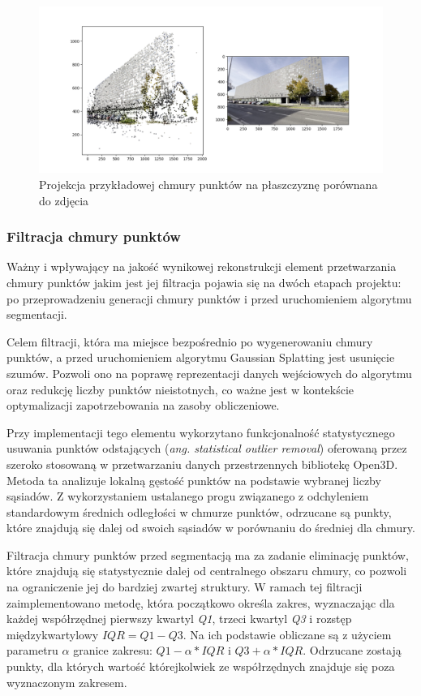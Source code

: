 \begin{figure}[!ht]
  \centering
  \includegraphics[width=0.9\linewidth]{img/sfm_projection.png}
  \caption{Projekcja przykładowej chmury punktów na płaszczyznę porównana do zdjęcia}
\end{figure}

\subsubsection{Filtracja chmury punktów}
Ważny i wpływający na jakość wynikowej rekonstrukcji element przetwarzania chmury punktów jakim jest jej filtracja pojawia się na dwóch etapach projektu: po przeprowadzeniu generacji chmury punktów i przed uruchomieniem algorytmu segmentacji. 

Celem filtracji, która ma miejsce bezpośrednio po wygenerowaniu chmury punktów, a przed uruchomieniem algorytmu Gaussian Splatting jest usunięcie szumów. Pozwoli ono na poprawę reprezentacji danych wejściowych do algorytmu oraz redukcję liczby punktów nieistotnych, co ważne jest w kontekście optymalizacji zapotrzebowania na zasoby obliczeniowe.

Przy implementacji tego elementu wykorzytano funkcjonalność statystycznego usuwania punktów odstających (\textit{ang. statistical outlier removal}) oferowaną przez szeroko stosowaną w przetwarzaniu danych przestrzennych bibliotekę Open3D\cite{Zhou2018}. Metoda ta analizuje lokalną gęstość punktów na podstawie wybranej liczby sąsiadów. Z wykorzystaniem ustalanego progu związanego z odchyleniem standardowym średnich odległości w chmurze punktów, odrzucane są punkty, które znajdują się dalej od swoich sąsiadów w porównaniu do średniej dla chmury. 

Filtracja chmury punktów przed segmentacją ma za zadanie eliminację punktów, które znajdują się 
statystycznie dalej od centralnego obszaru chmury, co pozwoli na ograniczenie jej do bardziej zwartej struktury. W ramach tej filtracji zaimplementowano metodę\cite{raviteja2023outliers}, która początkowo określa zakres, wyznaczając dla każdej współrzędnej pierwszy kwartyl \textit{Q1}, trzeci kwartyl \textit{Q3} i rozstęp międzykwartylowy $IQR = Q1 - Q3$. Na ich podstawie obliczane są z użyciem parametru $\alpha$ granice zakresu: $Q1 - \alpha * IQR$ i $Q3 + \alpha * IQR$. Odrzucane zostają punkty, dla których wartość którejkolwiek ze współrzędnych znajduje się poza wyznaczonym zakresem.


